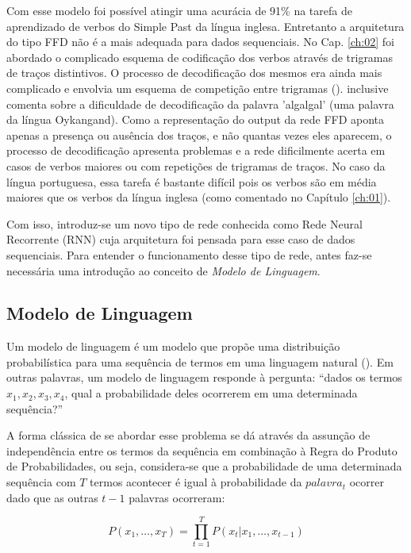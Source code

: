 Com esse modelo foi possível atingir uma acurácia de 91\% na tarefa de aprendizado de verbos do Simple Past da língua inglesa. Entretanto a arquitetura do tipo FFD não é a mais adequada para dados sequenciais. No Cap. \ref{ch:02} foi abordado o complicado esquema de codificação dos verbos através de trigramas de traços distintivos. O processo de decodificação dos mesmos era ainda mais complicado e envolvia um esquema de competição entre trigramas (\cite{rumelhart:1986}). \cite{Pinker:1999} inclusive comenta sobre a dificuldade de decodificação da palavra 'algalgal' (uma palavra da língua Oykangand). Como a representação do output da rede FFD aponta apenas a presença ou ausência dos traços, e não quantas vezes eles aparecem, o processo de decodificação apresenta problemas e a rede dificilmente acerta em casos de verbos maiores ou com repetições de trigramas de traços. No caso da língua portuguesa, essa tarefa é bastante difícil pois os verbos são em média maiores que os verbos da língua inglesa (como comentado no Capítulo \ref{ch:01}). 

Com isso, introduz-se um novo tipo de rede conhecida como Rede Neural Recorrente (RNN) cuja arquitetura foi pensada para esse caso de dados sequenciais. Para entender o funcionamento desse tipo de rede, antes faz-se necessária uma introdução ao conceito de \textit{Modelo de Linguagem}.

\subsection{Modelo de Linguagem}

Um modelo de linguagem é um modelo que propõe uma distribuição probabilística para uma sequência de termos em uma linguagem natural (\cite{manning99foundations}).
Em outras palavras, um modelo de linguagem responde à pergunta: “dados os termos $x_1,x_2,x_3,x_4$, qual a probabilidade deles ocorrerem em uma determinada sequência?”

A forma clássica de se abordar esse problema se dá através da assunção de independência entre os termos da sequência em combinação à Regra do Produto de Probabilidades, ou seja, considera-se que a probabilidade de uma determinada sequência com $T$ termos acontecer é igual à probabilidade da $palavra_{t}$ ocorrer dado que as outras $t-1$ palavras ocorreram:

\begin{equation}
P(x_1, \dots, x_T) = \prod_{t=1}^{T} P(x_t \vert x_1, \dots, x_{t-1}) 
\end{equation}

